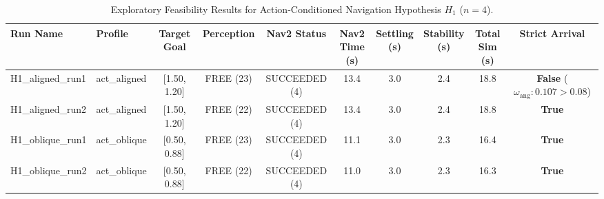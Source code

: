 \begin{table}[t]
\centering
\footnotesize
\caption{Exploratory Feasibility Results for Action-Conditioned Navigation Hypothesis $H_1$ ($n=4$).}
\label{tab:h1_feasibility}
\setlength{\tabcolsep}{3.0pt}
\begin{tabular*}{\textwidth}{@{\extracolsep{\fill}}llcccccccc@{}}
\toprule
Run Name & Profile & Target Goal & Perception & Nav2 Status & \shortstack{Nav2\\Time (s)} & \shortstack{Settling\\(s)} & \shortstack{Stability\\(s)} & \shortstack{Total\\Sim (s)} & Strict Arrival \\
\midrule
H1\_aligned\_run1 & act\_aligned & [1.50, 1.20] & FREE (23) & SUCCEEDED (4) & 13.4 & 3.0 & 2.4 & 18.8 & \shortstack{\textbf{False}\\\scriptsize($\omega_{\text{ang}}: 0.107 > 0.08$)} \\
H1\_aligned\_run2 & act\_aligned & [1.50, 1.20] & FREE (22) & SUCCEEDED (4) & 13.4 & 3.0 & 2.4 & 18.8 & \textbf{True} \\
H1\_oblique\_run1 & act\_oblique & [0.50, 0.88] & FREE (23) & SUCCEEDED (4) & 11.1 & 3.0 & 2.3 & 16.4 & \textbf{True} \\
H1\_oblique\_run2 & act\_oblique & [0.50, 0.88] & FREE (22) & SUCCEEDED (4) & 11.0 & 3.0 & 2.3 & 16.3 & \textbf{True} \\
\bottomrule
\end{tabular*}
\end{table}
